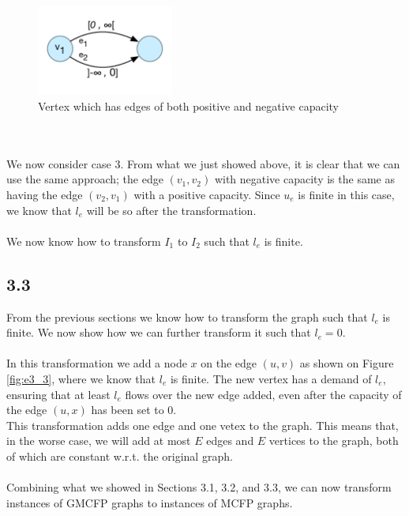 \documentclass[12pt]{article}
\begin{document}
\begin{figure}[h]
  \centering
    \includegraphics[width=0.4\textwidth]{figures/e3_2_b}
  \caption{Vertex which has edges of both positive and negative capacity}
  \label{fig:e3_2_b}
\end{figure}~\\
\\
We now consider case 3. From what we just showed above, it is clear that we can use the same approach; the edge $(v_1, v_2)$ with negative capacity is the same as having the edge $(v_2, v_1)$ with a positive capacity. Since $u_e$ is finite in this case, we know that $l_e$ will be so after the transformation.\\
\\
We now know how to transform $I_1$ to $I_2$ such that $l_e$ is finite.

\subsection{3.3}
From the previous sections we know how to transform the graph such that $l_e$ is finite. We now show how we can further transform it such that $l_e  = 0$.\\
\\
In this transformation we add a node $x$ on the edge $(u, v)$ as shown on Figure \ref{fig:e3_3}, where we know that $l_e$ is finite. The new vertex has a demand of $l_e$, ensuring that at least $l_e$ flows over the new edge added, even after the capacity of the edge $(u, x)$ has been set to 0.\\
This transformation adds one edge and one vetex to the graph. This means that, in the worse case, we will add at most $E$ edges and $E$ vertices to the graph, both of which are constant w.r.t. the original graph.\\
\\
Combining what we showed in Sections 3.1, 3.2, and 3.3, we can now transform instances of GMCFP graphs to instances of MCFP graphs.
\end{document}
